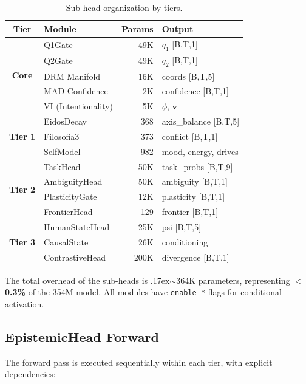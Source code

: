 \begin{table}[H]
\centering
\caption{Sub-head organization by tiers.}
\label{tab:tiers}
\begin{tabular}{clrl}
\toprule
\textbf{Tier} & \textbf{Module} & \textbf{Params} & \textbf{Output} \\
\midrule
\multirow{5}{*}{\textbf{Core}} & Q1Gate & ~49K & $q_1$ [B,T,1] \\
& Q2Gate & ~49K & $q_2$ [B,T,1] \\
& DRM Manifold & ~16K & coords [B,T,5] \\
& MAD Confidence & ~2K & confidence [B,T,1] \\
& VI (Intentionality) & ~5K & $\phi$, $\bm{v}$ \\
\midrule
\multirow{3}{*}{\textbf{Tier 1}} & EidosDecay & ~368 & axis\_balance [B,T,5] \\
& Filosofia3 & ~373 & conflict [B,T,1] \\
& SelfModel & ~982 & mood, energy, drives \\
\midrule
\multirow{4}{*}{\textbf{Tier 2}} & TaskHead & ~50K & task\_probs [B,T,9] \\
& AmbiguityHead & ~50K & ambiguity [B,T,1] \\
& PlasticityGate & ~12K & plasticity [B,T,1] \\
& FrontierHead & ~129 & frontier [B,T,1] \\
\midrule
\multirow{3}{*}{\textbf{Tier 3}} & HumanStateHead & ~25K & psi [B,T,5] \\
& CausalState & ~26K & conditioning \\
& ContrastiveHead & ~200K & divergence [B,T,1] \\
\bottomrule
\end{tabular}
\end{table}

The total overhead of the sub-heads is {\raise.17ex\hbox{$\scriptstyle\sim$}}364K
parameters, representing \textbf{$<$0.3\%} of the 354M model. All
modules have \texttt{enable\_*} flags for conditional activation.

\subsection{EpistemicHead Forward}

The forward pass is executed sequentially within each tier, with
explicit dependencies:

